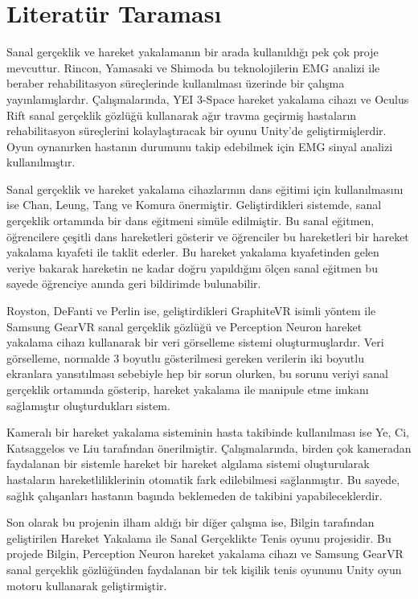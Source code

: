 \documentclass[a4paper, 12pt, titlepage]{article}
\begin{document}
\section{Literatür Taraması}
Sanal gerçeklik ve hareket yakalamanın bir arada kullanıldığı pek çok proje mevcuttur. Rincon,
Yamasaki ve Shimoda bu teknolojilerin EMG analizi ile beraber rehabilitasyon süreçlerinde
kullanılması üzerinde bir çalışma yayınlamışlardır. Çalışmalarında, YEI 3-Space hareket yakalama
cihazı ve Oculus Rift sanal gerçeklik gözlüğü kullanarak ağır travma geçirmiş hastaların
rehabilitasyon süreçlerini kolaylaştıracak bir oyunu Unity’de geliştirmişlerdir. Oyun oynanırken
hastanın durumunu takip edebilmek için EMG sinyal analizi kullanılmıştır.
\cite{edseee.743857520160101}

Sanal gerçeklik ve hareket yakalama cihazlarının dans eğitimi için kullanılmasını ise Chan, Leung,
Tang ve Komura önermiştir. Geliştirdikleri sistemde, sanal gerçeklik ortamında bir dans eğitmeni
simüle edilmiştir. Bu sanal eğitmen, öğrencilere çeşitli dans hareketleri gösterir ve öğrenciler
bu hareketleri bir hareket yakalama kıyafeti ile taklit ederler. Bu hareket yakalama kıyafetinden
gelen veriye bakarak hareketin ne kadar doğru yapıldığını ölçen sanal eğitmen bu sayede öğrenciye
anında geri bildirimde bulunabilir. \cite{edseee.555784020110101}

Royston, DeFanti ve Perlin ise, geliştirdikleri GraphiteVR isimli yöntem ile Samsung GearVR sanal
gerçeklik gözlüğü ve Perception Neuron hareket yakalama cihazı kullanarak bir veri görselleme
sistemi oluşturmuşlardır. Veri görselleme, normalde 3 boyutlu gösterilmesi gereken verilerin iki
boyutlu ekranlara yansıtılması sebebiyle hep bir sorun olurken, bu sorunu veriyi sanal gerçeklik
ortamında gösterip, hareket yakalama ile manipule etme imkanı sağlamıştır oluşturdukları sistem.
\cite{royston2016collaborative}

Kameralı bir hareket yakalama sisteminin hasta takibinde kullanılması ise Ye, Ci, Katsaggelos ve
Liu tarafından önerilmiştir. Çalışmalarında, birden çok kameradan faydalanan bir sistemle hareket
bir hareket algılama sistemi oluşturularak hastaların hareketliliklerinin otomatik fark
edilebilmesi sağlanmıştır. Bu sayede, sağlık çalışanları hastanın başında beklemeden de takibini
yapabileceklerdir. \cite{edseee.660756620130101}

Son olarak bu projenin ilham aldığı bir diğer çalışma ise, Bilgin tarafından geliştirilen Hareket
Yakalama ile Sanal Gerçeklikte Tenis oyunu projesidir. Bu projede Bilgin, Perception Neuron hareket
yakalama cihazı ve Samsung GearVR sanal gerçeklik gözlüğünden faydalanan bir tek kişilik tenis
oyununu Unity oyun motoru kullanarak geliştirmiştir. \cite{ebilgin}
\newpage
\end{document}
